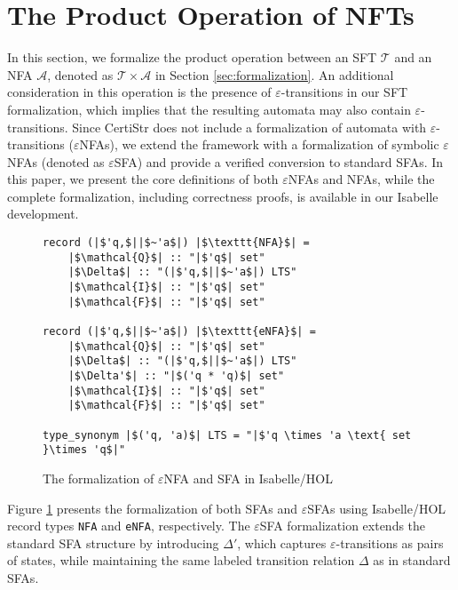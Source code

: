 \documentclass[a4paper,UKenglish,cleveref, autoref, anonymous, thm-restate]{lipics-v2021}
\begin{document}

\section{The Product Operation of NFTs}
\label{sec:product-operation}

In this section, we formalize the product operation between an SFT $\mathcal{T}$ and an NFA $\mathcal{A}$, denoted as $\mathcal{T} \times \mathcal{A}$ in Section \ref{sec:formalization}. An additional consideration in this operation is the presence of $\varepsilon$-transitions in our SFT formalization, which implies that the resulting automata may also contain $\varepsilon$-transitions. Since CertiStr \cite{cpp/KanLRS22} does not include a formalization of automata with $\varepsilon$-transitions ($\varepsilon$NFAs), we extend the framework with a formalization of symbolic $\varepsilon$NFAs (denoted as $\varepsilon$SFA) and provide a verified conversion to standard SFAs. In this paper, we present the core definitions of both $\varepsilon$NFAs and NFAs, while the complete formalization, including correctness proofs, is available in our Isabelle development.

\begin{figure}[hbt!]
	\begin{lstlisting}
record (|$'q,$||$~'a$|) |$\texttt{NFA}$| =
	|$\mathcal{Q}$| :: "|$'q$| set"
	|$\Delta$| :: "(|$'q,$||$~'a$|) LTS"
	|$\mathcal{I}$| :: "|$'q$| set"
	|$\mathcal{F}$| :: "|$'q$| set"

record (|$'q,$||$~'a$|) |$\texttt{eNFA}$| =
	|$\mathcal{Q}$| :: "|$'q$| set"
	|$\Delta$| :: "(|$'q,$||$~'a$|) LTS"
	|$\Delta'$| :: "|$('q * 'q)$| set"
	|$\mathcal{I}$| :: "|$'q$| set"
	|$\mathcal{F}$| :: "|$'q$| set"

type_synonym |$('q, 'a)$| LTS = "|$'q \times 'a \text{ set }\times 'q$|"    
	\end{lstlisting}
\caption{The formalization of $\varepsilon$NFA and SFA in Isabelle/HOL}
\label{fig-def-FAs}
\end{figure}

Figure \ref{fig-def-FAs} presents the formalization of both SFAs and $\varepsilon$SFAs using Isabelle/HOL record types \texttt{NFA} and \texttt{eNFA}, respectively. The $\varepsilon$SFA formalization extends the standard SFA structure by introducing $\Delta'$, which captures $\varepsilon$-transitions as pairs of states, while maintaining the same labeled transition relation $\Delta$ as in standard SFAs.
\end{document}
